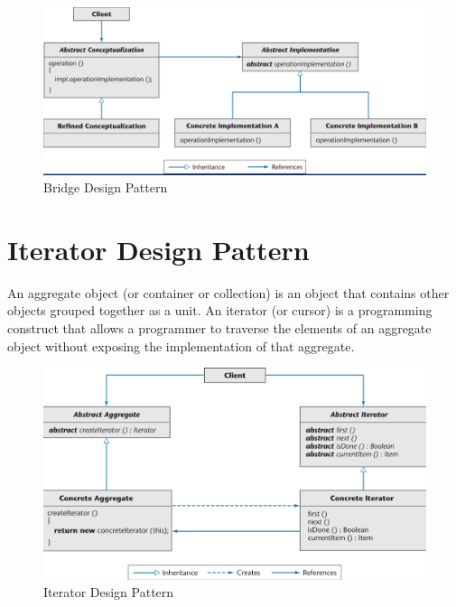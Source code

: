 \documentclass[11pt]{article}
\begin{document}
\begin{figure}[h]
	\centering
	\includegraphics[width=0.9\linewidth]{images/BridgePattern.png}
	\caption{Bridge Design Pattern}
	\label{fig:BridgePattern}
\end{figure}

\section*{Iterator Design Pattern}

An aggregate object (or container or collection) is an object that contains other objects grouped together as a unit. An iterator (or cursor) is a programming construct that allows a programmer to traverse the elements of an aggregate object without exposing the implementation of that aggregate.

\begin{figure}[h]
	\centering
	\includegraphics[width=0.9\linewidth]{images/IteratorPattern.png}
	\caption{Iterator Design Pattern}
	\label{fig:IteratorPattern}
\end{figure}

\newpage
\end{document}
